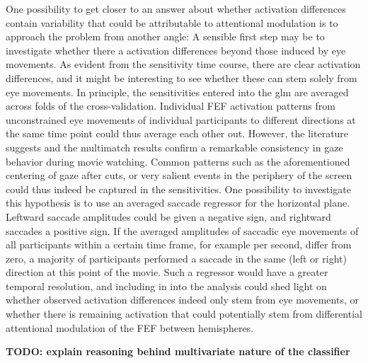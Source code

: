 \documentclass[a4paper, 12pt]{scrreprt}
\begin{document}
One possibility to get closer to an answer about whether activation differences contain variability that could be attributable to attentional modulation is to approach the problem from another angle: A sensible first step may be to investigate whether there a activation differences beyond those induced by eye movements. As evident from the sensitivity time course, there are clear activation differences, and it might be interesting to see whether these can stem solely from eye movements. In principle, the sensitivities entered into the glm are averaged across folds of the cross-validation. Individual FEF activation patterns from unconstrained eye movements of individual participants to different directions at the same time point could thus average each other out. However, the literature suggests and the multimatch results confirm a remarkable consistency in gaze behavior during movie watching. Common patterns such as the aforementioned centering of gaze after cuts, or very salient events in the periphery of the screen could thus indeed be captured in the sensitivities. One possibility to investigate this hypothesis is to use an averaged saccade regressor for the horizontal plane. Leftward saccade amplitudes could be given a negative sign, and rightward saccades a positive sign. If the averaged amplitudes of saccadic eye movements of all participants within a certain time frame, for example per second, differ from zero, a majority of participants performed a saccade in the same (left or right) direction at this point of the movie. Such a regressor would have a greater temporal resolution, and including in into the analysis could shed light on whether observed activation differences indeed only stem from eye movements, or whether there is remaining activation that could potentially stem from differential attentional modulation of the FEF between hemispheres.

\bigskip 

\textbf{TODO: explain reasoning behind multivariate nature of the classifier}
\end{document}
